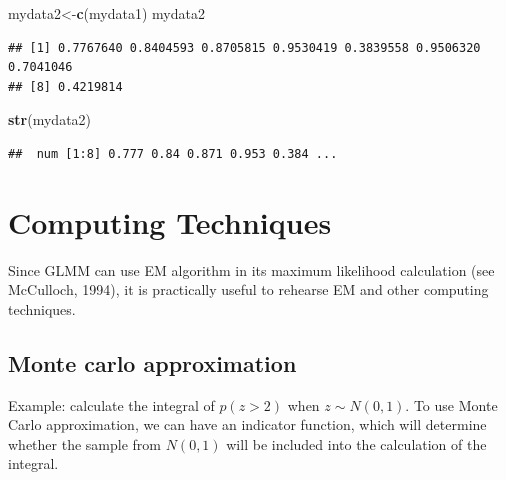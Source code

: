 \documentclass[]{book}
\newenvironment{Shaded}{\begin{snugshade}}{\end{snugshade}}
\newcommand{\KeywordTok}[1]{\textcolor[rgb]{0.13,0.29,0.53}{\textbf{#1}}}
\newcommand{\NormalTok}[1]{#1}
\begin{document}
\begin{Shaded}
\begin{Highlighting}[]
\NormalTok{mydata2<-}\KeywordTok{c}\NormalTok{(mydata1)}
\NormalTok{mydata2}
\end{Highlighting}
\end{Shaded}

\begin{verbatim}
## [1] 0.7767640 0.8404593 0.8705815 0.9530419 0.3839558 0.9506320 0.7041046
## [8] 0.4219814
\end{verbatim}

\begin{Shaded}
\begin{Highlighting}[]
\KeywordTok{str}\NormalTok{(mydata2)}
\end{Highlighting}
\end{Shaded}

\begin{verbatim}
##  num [1:8] 0.777 0.84 0.871 0.953 0.384 ...
\end{verbatim}

\chapter{Computing Techniques}\label{computing-techniques}

Since GLMM can use EM algorithm in its maximum likelihood calculation
(see McCulloch, 1994), it is practically useful to rehearse EM and other
computing techniques.

\section{Monte carlo approximation}\label{monte-carlo-approximation}

Example: calculate the integral of \(p(z>2)\) when \(z \sim N(0,1)\). To
use Monte Carlo approximation, we can have an indicator function, which
will determine whether the sample from \(N(0,1)\) will be included into
the calculation of the integral.
\end{document}
